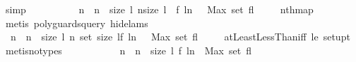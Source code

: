 \begin{isabellebody}
\ simp\isanewline
\ \ \isamarkupfalse%
\ \isamarkupfalse%
\ {\isachardoublequoteopen}{\isachardot}{\isachardot}{\isachardot}\ {\isacharequal}\ \isanewline
\ \ {\isacharbrackleft}n\ {\isachardot}\ n\ {\isacharless}{\isacharminus}\ {\isacharbrackleft}{}{\isachardot}{\isachardot}{\isacharless}size\ l{\isacharbrackright}{\isacharcomma}\ {\isacharparenleft}n{\isacharless}size\ l{\isacharparenright}\ {\isasymand}\ {\isacharparenleft}f\ {\isacharparenleft}l{\isacharbang}n{\isacharparenright}\ \ {\isasymge}\ Max\ {\isacharparenleft}set\ {\isacharquery}fl{\isacharparenright}{\isacharparenright}{\isacharbrackright}{\isachardoublequoteclose}\ \isanewline
\ \ \isamarkupfalse%
\ nth{\isacharunderscore}map\ \isamarkupfalse%
\ {\isacharparenleft}metis\ {\isacharparenleft}poly{\isacharunderscore}guards{\isacharunderscore}query{\isacharcomma}\ hide{\isacharunderscore}lams{\isacharparenright}{\isacharparenright}\ \isamarkupfalse%
\ \isamarkupfalse%
\ {\isachardoublequoteopen}{\isachardot}{\isachardot}{\isachardot}\ {\isacharequal}\ \isanewline
\ \ {\isacharbrackleft}n\ {\isachardot}\ n\ {\isacharless}{\isacharminus}\ {\isacharbrackleft}{}{\isachardot}{\isachardot}{\isacharless}size\ l{\isacharbrackright}{\isacharcomma}\ {\isacharparenleft}n{\isasymin}\ set\ {\isacharbrackleft}{}{\isachardot}{\isachardot}{\isacharless}size\ l{\isacharbrackright}{\isacharparenright}{\isacharcomma}{\isacharparenleft}f\ {\isacharparenleft}l{\isacharbang}n{\isacharparenright}\ \ {\isasymge}\ Max\ {\isacharparenleft}set\ {\isacharquery}fl{\isacharparenright}{\isacharparenright}{\isacharbrackright}{\isachardoublequoteclose}\ \isanewline
\ \ \isamarkupfalse%
\ atLeastLessThan{\isacharunderscore}iff\ le{}\ set{\isacharunderscore}upt\ \isamarkupfalse%
\ {\isacharparenleft}metis{\isacharparenleft}no{\isacharunderscore}types{\isacharparenright}{\isacharparenright}\isanewline
\ \ \isamarkupfalse%
\ \isamarkupfalse%
\ {\isachardoublequoteopen}{\isachardot}{\isachardot}{\isachardot}\ {\isacharequal}\ \ \isanewline
\ \ {\isacharbrackleft}n\ {\isachardot}\ n\ {\isacharless}{\isacharminus}\ {\isacharbrackleft}{}{\isachardot}{\isachardot}{\isacharless}size\ l{\isacharbrackright}{\isacharcomma}\ f\ {\isacharparenleft}l{\isacharbang}n{\isacharparenright}\ {\isasymge}\ Max\ {\isacharparenleft}set\ {\isacharquery}fl{\isacharparenright}{\isacharbrackright}{\isachardoublequoteclose}\ \isamarkupfalse%

\end{isabellebody}
